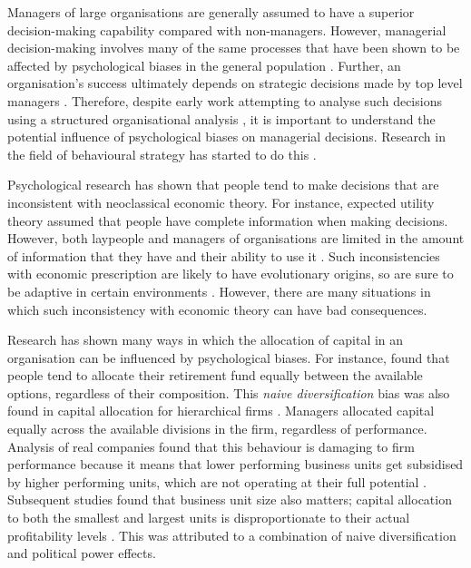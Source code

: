 \documentclass[a4paper, nobind]{templates/ociamthesis}
\theoremstyle{definition}
\theoremstyle{definition}
\theoremstyle{definition}
\theoremstyle{definition}
\theoremstyle{remark}
\begin{document}
Managers of large organisations are generally assumed to have a superior
decision-making capability compared with non-managers. However, managerial
decision-making involves many of the same processes that have been shown to be
affected by psychological biases in the general population \autocite{schwenk1984,das1999,mccray2002}. Further, an organisation's success ultimately depends on
strategic decisions made by top level managers \autocite{mazzolini1981}. Therefore,
despite early work attempting to analyse such decisions using a structured
organisational analysis \autocite[e.g.,][]{mintzberg1976}, it is important to understand
the potential influence of psychological biases on managerial decisions.
Research in the field of behavioural strategy has started to do this
\autocite{powell2011}.

Psychological research has shown that people tend to make decisions that are
inconsistent with neoclassical economic theory. For instance, expected utility
theory \autocites[EUT;][]{friedman1948,vonneumann1944} assumed that people have complete
information when making decisions. However, both laypeople and managers of
organisations are limited in the amount of information that they have and their
ability to use it \autocite{simon1955,cyert1956}. Such inconsistencies with economic
prescription are likely to have evolutionary origins, so are sure to be adaptive
in certain environments \autocite{haselton2009,gigerenzer2008,bettis2017}. However,
there are many situations in which such inconsistency with economic theory can
have bad consequences.

Research has shown many ways in which the allocation of capital in an
organisation can be influenced by psychological biases. For instance,
\textcite{benartzi2001} found that people tend to allocate their retirement fund equally
between the available options, regardless of their composition. This \emph{naive
diversification} bias was also found in capital allocation for hierarchical
firms \autocite{bardolet2011}. Managers allocated capital equally across the available
divisions in the firm, regardless of performance. Analysis of real companies
found that this behaviour is damaging to firm performance because it means that
lower performing business units get subsidised by higher performing units, which
are not operating at their full potential \autocite{arrfelt2015,bardolet2010}.
Subsequent studies found that business unit size also matters; capital
allocation to both the smallest and largest units is disproportionate to their
actual profitability levels \autocite{bardolet2017}. This was attributed to a
combination of naive diversification and political power effects.
\end{document}
